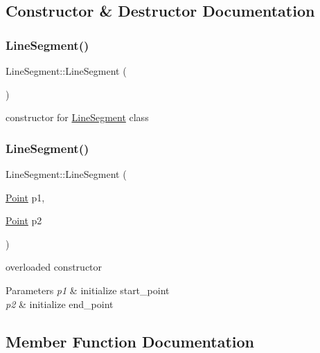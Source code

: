 \subsection{Constructor \& Destructor Documentation}
\mbox{\label{class_line_segment_a4c2da2ff2d3979f28bfcb24948a8e6a9}} 
\subsubsection{\texorpdfstring{LineSegment()}{LineSegment()}\hspace{0.1cm}{\footnotesize\ttfamily [1/2]}}
{\footnotesize\ttfamily Line\+Segment\+::\+Line\+Segment (\begin{DoxyParamCaption}{ }\end{DoxyParamCaption})}

constructor for \mbox{\hyperlink{class_line_segment}{Line\+Segment}} class \mbox{\label{class_line_segment_a691e185edf3aa7e2dc12307f9ef4be6b}} 
\subsubsection{\texorpdfstring{LineSegment()}{LineSegment()}\hspace{0.1cm}{\footnotesize\ttfamily [2/2]}}
{\footnotesize\ttfamily Line\+Segment\+::\+Line\+Segment (\begin{DoxyParamCaption}\item[{\mbox{\hyperlink{class_point}{Point}}}]{p1,  }\item[{\mbox{\hyperlink{class_point}{Point}}}]{p2 }\end{DoxyParamCaption})}

overloaded constructor 
\begin{DoxyParams}{Parameters}
{\em p1} & initialize start\+\_\+point \\
\hline
{\em p2} & initialize end\+\_\+point \\
\hline
\end{DoxyParams}


\subsection{Member Function Documentation}
\mbox{\label{class_line_segment_a8dc46fa1dd259befff8cea92232e2a29}} 
